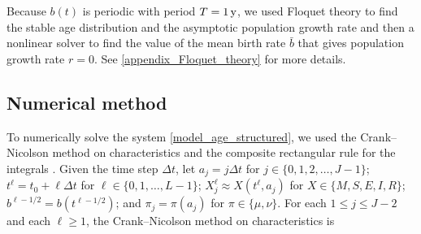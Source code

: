 \documentclass[USenglish]{article}
\begin{document}
Because $b(t)$ is periodic with period $T = \unit[1]{y}$, we used
Floquet theory to find the stable age distribution and the asymptotic
population growth rate and then a nonlinear solver to find the value
of the mean birth rate $\bar{b}$ that gives population growth rate $r
= 0$. See \autoref{appendix_Floquet_theory} for more details.


\subsection{Numerical method}

To numerically solve the system \eqref{model_age_structured}, we used
the Crank--Nicolson method on characteristics and the composite
rectangular rule for the integrals \autocite{milner_1992}.  Given the
time step $\Delta t$, let
$a_j = j \Delta t$ for $j \in \{0, 1, 2, \ldots, J - 1\}$;
$t^{\ell} = t_0 + \ell \Delta t$ for $\ell \in \{0, 1, \ldots, L - 1\}$;
$X_j^{\ell} \approx X(t^{\ell}, a_j)$ for $X \in \{M, S, E, I, R\}$;
$b^{\ell - 1 / 2} = b(t^{\ell - 1 / 2})$; and
$\pi_j = \pi(a_j)$ for $\pi \in \{\mu, \nu\}$.
For each $1 \leq j \leq J - 2$ and each $\ell \geq 1$, the
Crank--Nicolson method on characteristics is
\end{document}
